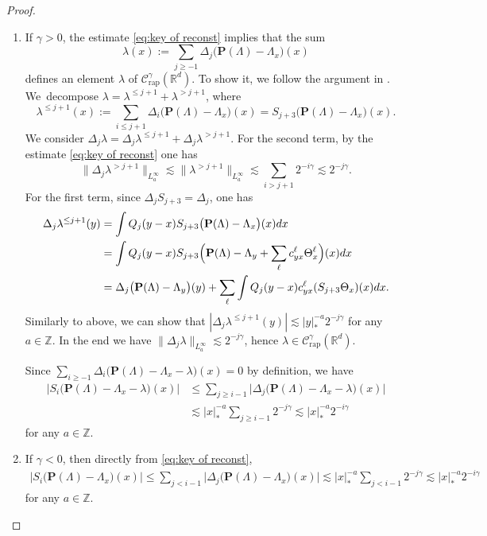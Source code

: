 \documentclass[JEP,XML,SOM,Unicode,published]{cedram}
\newenvironment{enumeratei}
{\bgroup\def\theenumi{\roman{enumi}}\def\theenumii{\arabic{enumii}}\begin{enumerate}}
{\end{enumerate}\egroup}
\theoremstyle{plain}
\theoremstyle{definition}
\newcommand{\rap}{\mathrm{rap}}
\newcommand{\bfP}{\mathbf{P}}
\newcommand{\bbR}{\mathbb{R}}
\newcommand{\bbZ}{\mathbb{Z}}
\newcommand{\mcC}{\mathcal{C}}
\begin{document}
\begin{proof}
\begin{enumeratei}
\item
If $\gamma>0$, the estimate \eqref{eq:key of reconst} implies that the sum
\[
\lambda(x):=\sum_{j\ge-1}\Delta_j\bigl(\bfP(\Lambda)-\Lambda_x\bigr)(x)
\]
defines an element $\lambda$ of $\mcC_{\rap}^\gamma(\bbR^d)$.
To show it, we follow the argument in \cite[\S6]{GIP}.
We~decompose $\lambda=\lambda^{\le j+1}+\lambda^{>j+1}$, where
\[
\lambda^{\le j+1}(x):=\sum_{i\le j+1}\Delta_i\bigl(\bfP(\Lambda)-\Lambda_x\bigr)(x)
=S_{j+3}\bigl(\bfP(\Lambda)-\Lambda_x\bigr)(x).
\]
We consider $\Delta_j\lambda=\Delta_j\lambda^{\le j+1}+\Delta_j\lambda^{>j+1}$.
For the second term, by the estimate \eqref{eq:key of reconst} one has
\[
\|\Delta_j\lambda^{>j+1}\|_{L_a^\infty}
\lesssim\|\lambda^{>j+1}\|_{L_a^\infty}
\lesssim\sum_{i>j+1}2^{-i\gamma}\lesssim2^{-j\gamma}.
\]
For the first term, since $\Delta_jS_{j+3}=\Delta_j$, one has
\begin{align*}
\Delta_j\lambda^{\le j+1}(y)
&=\int Q_j(y-x)S_{j+3}\bigl(\bfP(\Lambda)-\Lambda_x\bigr)(x)dx\\
&=\int Q_j(y-x)S_{j+3}\Bigl(\bfP(\Lambda)-\Lambda_y+\sum_\ell c_{yx}^\ell\Theta_x^\ell\Bigr)(x)dx\\
&=\Delta_j\bigl(\bfP(\Lambda)-\Lambda_y\bigr)(y)+\sum_\ell\int Q_j(y-x)c_{yx}^\ell (S_{j+3}\Theta_x)(x)dx.
\end{align*}
Similarly to above, we can show that $|\Delta_j\lambda^{\le j+1}(y)|\lesssim|y|_*^{-a}2^{-j\gamma}$ for any $a\in\bbZ$.
In the end we have $\|\Delta_j\lambda\|_{L_a^\infty}\lesssim2^{-j\gamma}$, hence $\lambda\in\mcC_\rap^\gamma(\bbR^d)$.

Since $\sum_{i\ge-1}\Delta_i\bigl(\bfP(\Lambda)-\Lambda_x-\lambda\bigr)(x)=0$ by definition, we have
\begin{align*}
\big| S_i\bigl(\bfP(\Lambda)-\Lambda_x-\lambda\bigr)(x) \big|
&\le\sum_{j\ge i-1}\big| \Delta_j\bigl(\bfP(\Lambda)-\Lambda_x-\lambda\bigr)(x) \big|\\
&\lesssim|x|_*^{-a}\sum_{j\ge i-1}2^{-j\gamma}\lesssim|x|_*^{-a}2^{-i\gamma}
\end{align*}
for any $a\in\bbZ$.

\item
If $\gamma<0$, then directly from \eqref{eq:key of reconst},
\begin{align*}
\big| S_i\bigl(\bfP(\Lambda)-\Lambda_x\bigr)(x) \big|
\le\sum_{j< i-1}\big| \Delta_j\bigl(\bfP(\Lambda)-\Lambda_x\bigr)(x) \big|
\lesssim|x|_*^{-a}\sum_{j< i-1}2^{-j\gamma}\lesssim|x|_*^{-a}2^{-i\gamma}
\end{align*}
for any $a\in\bbZ$.\qedhere
\end{enumeratei}
\end{proof}
\end{document}
